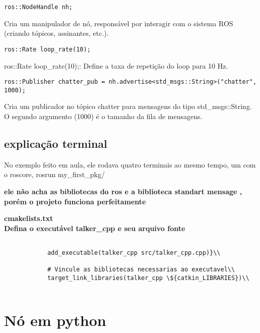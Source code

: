 \documentclass[letterpaper]{article}
\begin{document}
        \begin{lstlisting}[style=cppStyle, title= Criação de um NodeHandle] 
            ros::NodeHandle nh;
        \end{lstlisting}
         Cria um manipulador de nó, responsável por interagir com o sistema ROS (criando tópicos, assinantes, etc.).
        \begin{lstlisting}[style=cppStyle, title= Definição da Taxa de Loop] 
            ros::Rate loop_rate(10);
        \end{lstlisting}
        ros::Rate loop\_rate(10);: Define a taxa de repetição do loop para 10 Hz.
        
        \begin{lstlisting}[style=cppStyle, title= Criando o Publicador] 
            ros::Publisher chatter_pub = nh.advertise<std_msgs::String>("chatter", 1000);
        \end{lstlisting}
         Cria um publicador no tópico chatter para mensagens do tipo std\_msgs::String. O segundo argumento (1000) é o tamanho da fila de mensagens.
    \subsection{explicação terminal}
    
        No exemplo feito em aula, ele rodava quatro terminais ao mesmo tempo, um com o roscore, rosrun my\_first\_pkg/
        
        \textbf{ele não acha as bibliotecas do ros e a biblioteca standart mensage , porém o projeto funciona perfeitamente}
        
        \textbf{cmakelists.txt}\\
        \textbf{Defina o executável talker\_cpp e seu arquivo fonte}
        \begin{lstlisting}[style=bashStyle, title=cmakeLists.txt] 
            
            add_executable(talker_cpp src/talker_cpp.cpp)}\\
            
            # Vincule as bibliotecas necessarias ao executavel\\
            target_link_libraries(talker_cpp \${catkin_LIBRARIES})\\
            
        \end{lstlisting}

\section{Nó em python}
\end{document}
